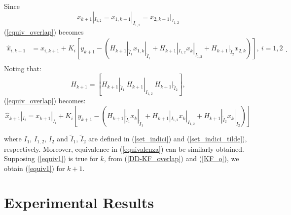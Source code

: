 \documentclass[smallcondensed]{svjour3}
\begin{document}
{\noindent Since 
\footnotesize
$$x_{k+1}|_{I_{1,2}}= x_{1,k+1}|_{I_{1,2}}=x_{2,k+1}|_{I_{1,2}}$$
(\ref{equiv_overlap}) becomes 
\footnotesize
\begin{equation}\label{DD-KF_overlap}
\begin{array}{ll}
\widehat{x}_{i,k+1}&=x_{i,k+1}+K_{i}\left[y_{k+1}-(H_{k+1}|_{\tilde{I}_{1}}x_{1,k}|_{\tilde{I}_{1}} +H_{k+1}|_{{I}_{1,2}}x_{k}|_{I_{1,2}}+H_{k+1}|_{\tilde{I}_{2}}x_{2,k})\right], \ i=1,2 \\
\end{array}.
\end{equation}
Noting that:
\begin{equation*}\label{dec_H}
    H_{k+1}=\left[H_{k+1}|_{\tilde{I}_1} \ H_{k+1}|_{{I}_{1,2}} \ H_{k+1}|_{\tilde{I}_2} \right],
\end{equation*}
\noindent  (\ref{equiv_overlap}) becomes:
\footnotesize
\begin{equation}\label{KF_o}
   \widehat{x}_{k+1}|_{I_i}=x_{k+1}|_{I_i}+K_{i}\left[y_{k+1}-(H_{k+1}|_{\tilde{I}_{1}}x_{k}|_{\tilde{I}_{1}} +H_{k+1}|_{{I}_{1,2}}x_{k}|_{I_{1,2}}+H_{k+1}|_{\tilde{I}_{2}}x_{k}|_{I_2})\right] 
\end{equation}

\noindent where $I_1$, $I_{1,2}$, $I_{2}$ and $\tilde{I}_{1}$, $\tilde{I}_{2}$ are defined in (\ref{set_indici}) and (\ref{set_indici_tilde}), respectively. Moreover,  equivalence in (\ref{equivalenza}) can be   similarly  obtained. Supposing (\ref{equiv1}) is true for  $k$, from (\ref{DD-KF_overlap}) and (\ref{KF_o}), we obtain  (\ref{equiv1}) for $k+1$. 
\\[.5cm]
    
}

\normalsize

\section{Experimental Results}
\end{document}
